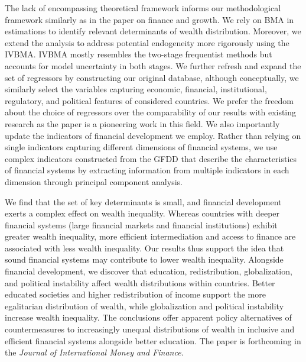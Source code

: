 \begin{refsection}
The lack of encompassing theoretical framework informs our methodological framework similarly as in the paper on finance and growth. We rely on \ac{BMA} in estimations to identify relevant determinants of wealth distribution. Moreover, we extend the analysis to address potential endogeneity more rigorously using the \ac{IVBMA}. \ac{IVBMA} mostly resembles the two-stage frequentist methods but accounts for model uncertainty in both stages. We further refresh and expand the set of regressors by constructing our original database, although conceptually, we similarly select the variables capturing economic, financial, institutional, regulatory, and political features of considered countries. We prefer the freedom about the choice of regressors over the comparability of our results with existing research as the paper is a pioneering work in this field. We also importantly update the indicators of financial development we employ. Rather than relying on single indicators capturing different dimensions of financial systems, we use complex indicators constructed from the \ac{GFDD} that describe the characteristics of financial systems by extracting information from multiple indicators in each dimension through principal component analysis.

We find that the set of key determinants is small, and financial development exerts a complex effect on wealth inequality. Whereas countries with deeper financial systems (large financial markets and financial institutions) exhibit greater wealth inequality, more efficient intermediation and access to finance are associated with less wealth inequality. Our results thus support the idea that sound financial systems may contribute to lower wealth inequality. Alongside financial development, we discover that education, redistribution, globalization, and political instability affect wealth distributions within countries. Better educated societies and higher redistribution of income support the more egalitarian distribution of wealth, while globalization and political instability increase wealth inequality. The conclusions offer apparent policy alternatives of countermeasures to increasingly unequal distributions of wealth in inclusive and efficient financial systems alongside better education. The paper is forthcoming in the \emph{Journal of International Money and Finance}.


\end{refsection}

